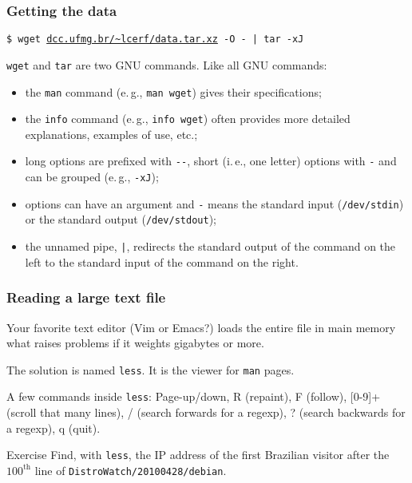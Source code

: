 \documentclass{beamer}
\newcommand{\ie}{i.\,e.}
\newcommand{\eg}{e.\,g.}
\begin{document}
\begin{frame}
  \frametitle{Getting the data}
  \texttt{\$ wget \url{dcc.ufmg.br/~lcerf/data.tar.xz} -O - | tar -xJ}

  \vfill
  \pause

  \texttt{wget} and \texttt{tar} are two GNU commands. Like all GNU
  commands:
  \begin{itemize}[<+->]
  \item the \texttt{man} command (\eg, \texttt{man wget}) gives their
    specifications;
  \item the \texttt{info} command (\eg, \texttt{info wget}) often
    provides more detailed explanations, examples of use, etc.;
  \item long options are prefixed with \texttt{{-}{-}}, short (\ie,
    one letter) options with \texttt{-} and can be grouped (\eg,
    \texttt{-xJ});
  \item options can have an argument and \texttt{-} means the standard
    input (\texttt{/dev/stdin}) or the standard output
    (\texttt{/dev/stdout});
  \item the unnamed pipe, \texttt{|}, redirects the standard output of
    the command on the left to the standard input of the command on
    the right.
  \end{itemize}
\end{frame}

\begin{frame}
  \frametitle{Reading a large text file}
  Your favorite text editor (Vim or Emacs?) loads the entire file in
  main memory what raises problems if it weights gigabytes or more.

  \vfill
  \pause

  The solution is named \texttt{less}. It is the viewer for
  \texttt{man} pages.

  \vfill

  A few commands inside \texttt{less}: Page-up/down, R (repaint), F
  (follow), [0-9]+ (scroll that many lines), / (search forwards for a
  regexp), ? (search backwards for a regexp), q (quit).

  \vfill
  \pause

  \begin{exampleblock}{Exercise}
    Find, with \texttt{less}, the IP address of the first Brazilian
    visitor after the $100^{\text{th}}$ line of
    \texttt{DistroWatch/20100428/debian}.
  \end{exampleblock}
\end{frame}
\end{document}
